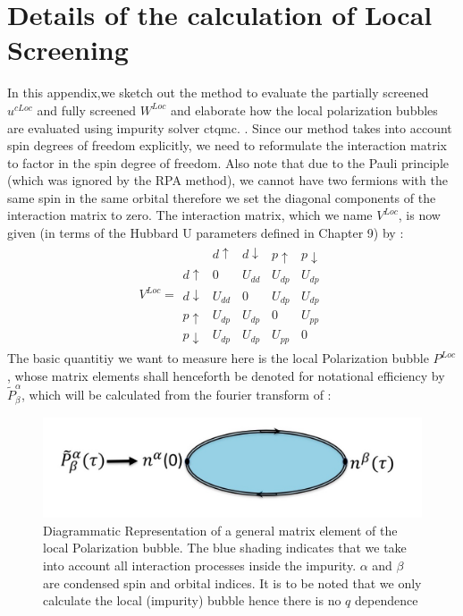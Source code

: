 \documentclass[10pt]{ruthesis}
\begin{document}
{\clearpage
{}



\appendix
\chapter{Details of the calculation of Local Screening} \label{App_crpa}
In this appendix,we sketch out the method to evaluate the partially screened $u^{cLoc}$ and fully screened $W^{Loc}$ and  elaborate how the local polarization bubbles are evaluated using impurity solver ctqmc.
. Since our method takes into account spin degrees of freedom explicitly, we need to reformulate the interaction matrix to factor in the spin degree of freedom. Also note that due to the Pauli principle (which was ignored by the RPA method), we cannot have two fermions with the same spin in the same orbital therefore we set the diagonal components of the interaction matrix to zero.  The interaction matrix, which we name $V^{Loc}$, is now given (in terms of the Hubbard U parameters defined in Chapter 9) by  :
\begin{eqnarray}
V^{Loc}=
\begin{array}{c|cccc}
&d\uparrow&d\downarrow&p\uparrow&p\downarrow\\
\hline
d\uparrow&0&U_{dd}&U_{dp}&U_{dp}\\
d\downarrow&U_{dd}&0&U_{dp}&U_{dp}\\
p\uparrow&U_{dp}&U_{dp}&0&U_{pp}\\
p\downarrow&U_{dp}&U_{dp}&U_{pp}&0
\end{array}
\end{eqnarray}
The basic quantitiy we want to measure here is the local Polarization bubble $P^{Loc}$,  whose matrix elements shall henceforth be denoted for notational efficiency by $\tilde P^{\alpha}_{\beta}$, which will be calculated from the fourier transform of :

\begin{figure}[H]
\begin{center}
\includegraphics[width=0.85\columnwidth]{P_loc_bubble.jpg}
\caption{Diagrammatic Representation of a general matrix element of the local Polarization bubble. The blue shading indicates that we take into account all interaction processes inside the impurity. $\alpha$ and $\beta$ are condensed spin and orbital indices. It is to be noted that we only calculate the local (impurity) bubble hence there is no $q$ dependence   }
\end{center}
\end{figure}
 
}
\end{document}
